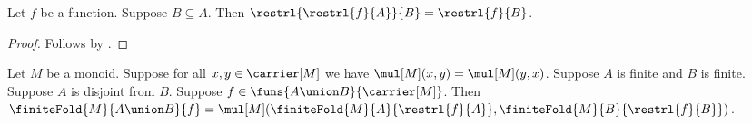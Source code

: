 \begin{lemma}\label{monoid_restriction_of_restriction}
    Let $f$ be a function.
    Suppose $B\subseteq A$.
    Then
        $\restrl{\restrl{f}{A}}{B}=\restrl{f}{B}$.
\end{lemma}
\begin{proof}
    Follows by .
\end{proof}

\begin{theorem}\label{monoid_finite_fold_disjoint_union}
    Let $M$ be a monoid.
    Suppose for all $x,y\in\carrier[M]$ we have
        $\mul[M](x,y)=\mul[M](y,x)$.
    Suppose $A$ is finite and $B$ is finite.
    Suppose $A$ is disjoint from $B$.
    Suppose $f\in\funs{A\union B}{\carrier[M]}$.
    Then
        $\finiteFold{M}{A\union B}{f}
        =\mul[M](
            \finiteFold{M}{A}{\restrl{f}{A}},
            \finiteFold{M}{B}{\restrl{f}{B}})$.
\end{theorem}
